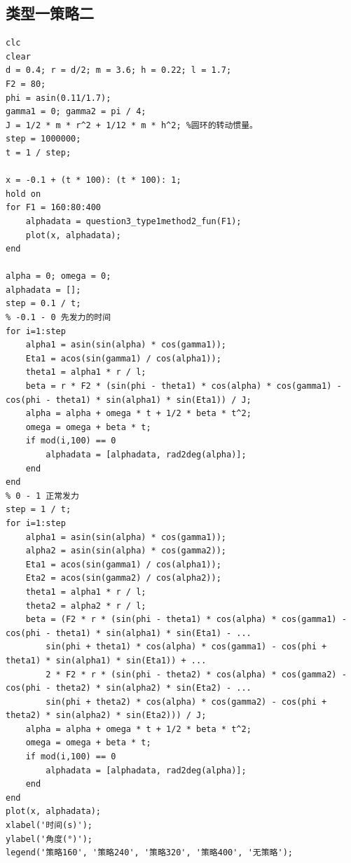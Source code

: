 \documentclass{cumcm}
\begin{document}
\subsection{类型一策略二}
\begin{lstlisting}
clc
clear
d = 0.4; r = d/2; m = 3.6; h = 0.22; l = 1.7;
F2 = 80;
phi = asin(0.11/1.7);
gamma1 = 0; gamma2 = pi / 4;
J = 1/2 * m * r^2 + 1/12 * m * h^2; %圆环的转动惯量。
step = 1000000;
t = 1 / step;

x = -0.1 + (t * 100): (t * 100): 1;
hold on
for F1 = 160:80:400
    alphadata = question3_type1method2_fun(F1);
    plot(x, alphadata);
end

alpha = 0; omega = 0;
alphadata = [];
step = 0.1 / t;
% -0.1 - 0 先发力的时间
for i=1:step
    alpha1 = asin(sin(alpha) * cos(gamma1));
    Eta1 = acos(sin(gamma1) / cos(alpha1));
    theta1 = alpha1 * r / l;
    beta = r * F2 * (sin(phi - theta1) * cos(alpha) * cos(gamma1) - cos(phi - theta1) * sin(alpha1) * sin(Eta1)) / J;
    alpha = alpha + omega * t + 1/2 * beta * t^2;
    omega = omega + beta * t;
    if mod(i,100) == 0
        alphadata = [alphadata, rad2deg(alpha)];
    end
end
% 0 - 1 正常发力
step = 1 / t;
for i=1:step
    alpha1 = asin(sin(alpha) * cos(gamma1));
    alpha2 = asin(sin(alpha) * cos(gamma2));
    Eta1 = acos(sin(gamma1) / cos(alpha1));
    Eta2 = acos(sin(gamma2) / cos(alpha2));
    theta1 = alpha1 * r / l;
    theta2 = alpha2 * r / l;
    beta = (F2 * r * (sin(phi - theta1) * cos(alpha) * cos(gamma1) - cos(phi - theta1) * sin(alpha1) * sin(Eta1) - ...
        sin(phi + theta1) * cos(alpha) * cos(gamma1) - cos(phi + theta1) * sin(alpha1) * sin(Eta1)) + ...
        2 * F2 * r * (sin(phi - theta2) * cos(alpha) * cos(gamma2) - cos(phi - theta2) * sin(alpha2) * sin(Eta2) - ...
        sin(phi + theta2) * cos(alpha) * cos(gamma2) - cos(phi + theta2) * sin(alpha2) * sin(Eta2))) / J;
    alpha = alpha + omega * t + 1/2 * beta * t^2;
    omega = omega + beta * t;
    if mod(i,100) == 0
        alphadata = [alphadata, rad2deg(alpha)];
    end
end
plot(x, alphadata);
xlabel('时间(s)');
ylabel('角度(°)');
legend('策略160', '策略240', '策略320', '策略400', '无策略');
\end{lstlisting}
\end{document}

